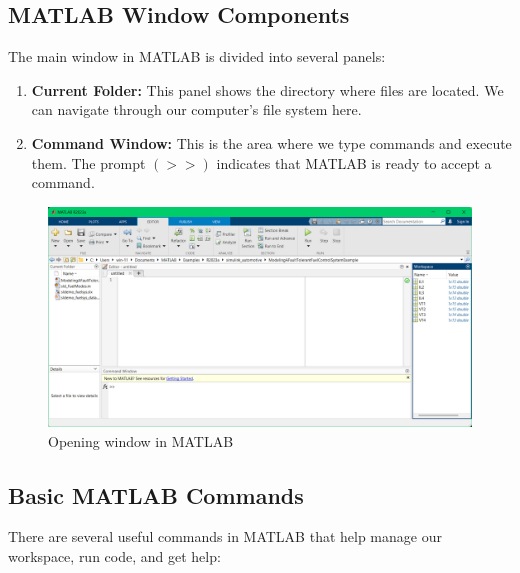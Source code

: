 \documentclass[a4paper,12pt]{article}
\begin{document}
\subsection*{MATLAB Window Components}
The main window in MATLAB is divided into several panels:

\begin{enumerate}
	\item \textbf{Current Folder:} This panel shows the directory where files are located. We can navigate through our computer's file system here.
	\item \textbf{Command Window:} This is the area where we type commands and execute them. The prompt $(>>)$ indicates that MATLAB is ready to accept a command.
\end{enumerate}
\begin{figure}[H]
	\centering
	\includegraphics[width=1\linewidth, height=0.4\textheight]{Images/4}
	\caption{Opening window in MATLAB}
	\label{fig:screenshot002}
\end{figure}
\subsection*{Basic MATLAB Commands}
There are several useful commands in MATLAB that help manage our workspace, run code, and get help:
\end{document}
